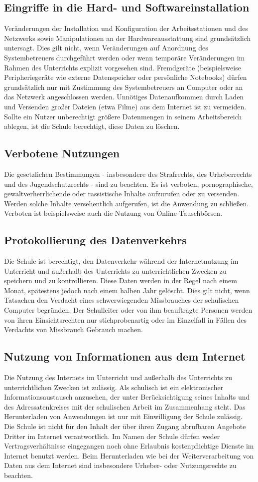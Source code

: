 \documentclass[a4paper, parskip]{scrartcl}
\begin{document}
\subsection{Eingriffe in die Hard- und Softwareinstallation}
Veränderungen der Installation und Konfiguration der Arbeitsstationen und des
Netzwerks sowie Manipulationen an der Hardwareausstattung sind grundsätzlich
untersagt. Dies gilt nicht, wenn Veränderungen auf Anordnung des
Systembetreuers durchgeführt werden oder wenn temporäre Veränderungen im Rahmen
des Unterrichts explizit vorgesehen sind. Fremdgeräte (beispielsweise
Peripheriegeräte wie externe Datenspeicher oder persönliche Notebooks) dürfen
grundsätzlich nur mit Zustimmung des Systembetreuers an Computer oder an das
Netzwerk angeschlossen werden. Unnötiges Datenaufkommen durch Laden und
Versenden großer Dateien (etwa Filme) aus dem Internet ist zu vermeiden. Sollte
ein Nutzer unberechtigt größere Datenmengen in seinem Arbeitsbereich ablegen,
ist die Schule berechtigt, diese Daten zu löschen.
\subsection{Verbotene Nutzungen}
Die gesetzlichen Bestimmungen - insbesondere des Strafrechts, des Urheberrechts
und des Jugendschutzrechts - sind zu beachten. Es ist verboten,
pornographische, gewaltverherrlichende oder rassistische Inhalte aufzurufen
oder zu versenden. Werden solche Inhalte versehentlich aufgerufen, ist die
Anwendung zu schließen. Verboten ist beispielsweise auch die Nutzung von
Online-Tauschbörsen.
\subsection{Protokollierung des Datenverkehrs}
Die Schule ist berechtigt, den Datenverkehr während der Internetnutzung im
Unterricht und außerhalb des Unterrichts zu unterrichtlichen Zwecken zu
speichern und zu kontrollieren. Diese Daten werden in der Regel nach einem
Monat, spätestens jedoch nach einem halben Jahr gelöscht. Dies gilt nicht,
wenn Tatsachen den Verdacht eines schwerwiegenden Missbrauches der schulischen
Computer begründen. Der Schulleiter oder von ihm beauftragte Personen werden
von ihren Einsichtsrechten nur stichprobenartig oder im Einzelfall in Fällen
des Verdachts von Missbrauch Gebrauch machen.
\subsection{Nutzung von Informationen aus dem Internet}
Die Nutzung des Internets im Unterricht und außerhalb des Unterrichts zu
unterrichtlichen Zwecken ist zulässig. Als schulisch ist ein elektronischer
Informationsaustausch anzusehen, der unter Berücksichtigung seines Inhalts
und des Adressatenkreises mit der schulischen Arbeit im Zusammenhang steht.
Das Herunterladen von Anwendungen ist nur mit Einwilligung der Schule zulässig.
Die Schule ist nicht für den Inhalt der über ihren Zugang abrufbaren
Angebote Dritter im Internet verantwortlich. Im Namen der Schule dürfen weder
Vertragsverhältnisse eingegangen noch ohne Erlaubnis kostenpflichtige Dienste
im Internet benutzt werden. Beim Herunterladen wie bei der Weiterverarbeitung
von Daten aus dem Internet sind insbesondere Urheber- oder Nutzungsrechte zu
beachten.
\end{document}
